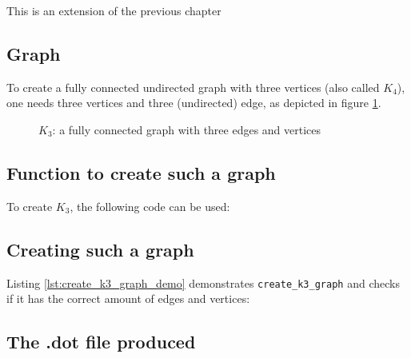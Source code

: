 This is an extension of the previous chapter

\subsection{Graph}

To create a fully connected undirected graph with three vertices 
(also called $K_{4}$), 
one needs three vertices and three (undirected) edge, 
as depicted in figure \ref{fig:create_k3_graph}.

\begin{figure}
  \caption{$K_{3}$: a fully connected graph with three edges and vertices }
  \label{fig:create_k3_graph}
\end{figure}

\subsection{Function to create such a graph}

To create $K_{3}$, the following code can be used:



\subsection{Creating such a graph}

Listing \ref{lst:create_k3_graph_demo} demonstrates 
\verb;create_k3_graph; and checks if it has the correct
amount of edges and vertices:



\subsection{The .dot file produced}
\label{subsec:create_k3_graph.dot}

